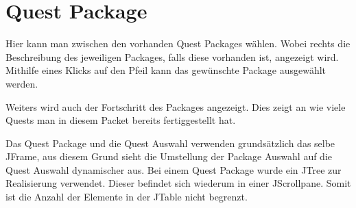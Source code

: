 \section{Quest Package}
Hier kann man zwischen den vorhanden Quest Packages wählen. Wobei rechts die Beschreibung des jeweiligen Packages, falls diese vorhanden ist, angezeigt wird. Mithilfe eines Klicks auf den Pfeil kann das gewünschte Package ausgewählt werden.

Weiters wird auch der Fortschritt des Packages angezeigt. Dies zeigt an wie viele Quests man in diesem Packet bereits fertiggestellt hat.

Das Quest Package und die Quest Auswahl verwenden grundsätzlich das selbe JFrame, aus diesem Grund sieht die Umstellung der Package Auswahl auf die Quest Auswahl dynamischer aus. Bei einem Quest Package wurde ein JTree zur Realisierung verwendet.  Dieser befindet sich wiederum in einer JScrollpane. Somit ist die Anzahl der Elemente in der JTable nicht begrenzt.